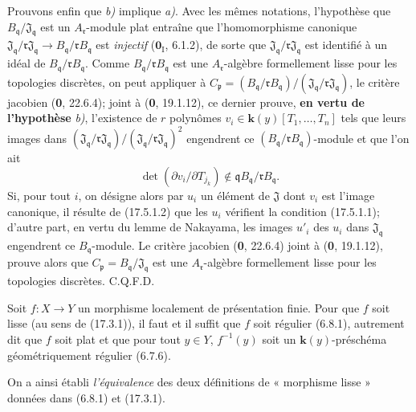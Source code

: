 Prouvons enfin que \emph{b)} implique \emph{a)}. Avec les mêmes notations, l'hypothèse que $B_{\mathfrak q}/\mathfrak J_{\mathfrak q}$ est un $A_{\mathfrak r}$-module plat entraîne que l'homomorphisme canonique $\mathfrak J_{\mathfrak q}/\mathfrak r\mathfrak J_{\mathfrak q}\to B_{\mathfrak q}/\mathfrak rB_{\mathfrak q}$ est \emph{injectif} ($\mathbf{0}_{\mathrm I}$, 6.1.2), de sorte que $\mathfrak J_{\mathfrak q}/\mathfrak r\mathfrak J_{\mathfrak q}$ est identifié à un idéal de $B_{\mathfrak q}/\mathfrak rB_{\mathfrak q}$. Comme $B_{\mathfrak q}/\mathfrak rB_{\mathfrak q}$ est une $A_{\mathfrak r}$-algèbre formellement lisse pour les topologies discrètes, on peut appliquer à $C_{\mathfrak p}=(B_{\mathfrak q}/\mathfrak rB_{\mathfrak q})/(\mathfrak J_{\mathfrak q}/\mathfrak r\mathfrak J_{\mathfrak q})$, le critère jacobien (\textbf{0}, 22.6.4); joint à (\textbf{0}, 19.1.12), ce dernier prouve, \textbf{en vertu de l'hypothèse} \emph{b)}, l'existence de $r$ polynômes $v_i\in\boldsymbol{k}(y)[T_1,\ldots,T_n]$ tels que leurs images dans $(\mathfrak J_{\mathfrak q}/\mathfrak r\mathfrak J_{\mathfrak q})/(\mathfrak J_{\mathfrak q}/\mathfrak r\mathfrak J_{\mathfrak q})^2$ engendrent ce $(B_{\mathfrak q}/\mathfrak rB_{\mathfrak q})$-module et que l'on ait
\[
\label{IV.17.5.1.2}
\det(\partial v_i/\partial T_{j_k})\notin\mathfrak qB_{\mathfrak q}/\mathfrak rB_{\mathfrak q}.
\tag{17.5.1.2}
\]
Si, pour tout $i$, on désigne alors par $u_i$ un élément de $\mathfrak J$ dont $v_i$ est l'image canonique, il résulte de (17.5.1.2) que les $u_i$ vérifient la condition (17.5.1.1); d'autre part, en vertu du lemme de Nakayama, les images $u'_i$ des $u_i$ dans $\mathfrak J_{\mathfrak q}$ engendrent ce $B_{\mathfrak q}$-module. Le critère jacobien (\textbf{0}, 22.6.4) joint à (\textbf{0}, 19.1.12), prouve alors que $C_{\mathfrak p}=B_{\mathfrak q}/\mathfrak J_{\mathfrak q}$ est une $A_{\mathfrak r}$-algèbre formellement lisse pour les topologies discrètes. C.Q.F.D.

\begin{corollary}[17.5.2]
\label{IV.17.5.2}
Soit $f:X\to Y$ un morphisme localement de présentation finie. Pour que $f$ soit lisse \textup{(}au sens de \textup{(17.3.1))}, il faut et il suffit que $f$ soit régulier \textup{(6.8.1)}, autrement dit que $f$ soit plat et que pour tout $y\in Y$, $f^{-1}(y)$ soit un $\boldsymbol{k}(y)$-préschéma géométriquement régulier \textup{(6.7.6)}.
\end{corollary}

On a ainsi établi \emph{l'équivalence} des deux définitions de « morphisme lisse » données dans (6.8.1) et (17.3.1).

